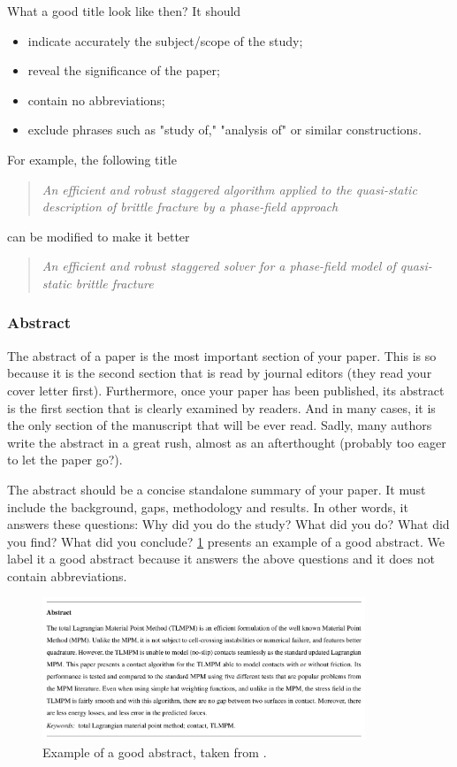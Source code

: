 \documentclass[authoryear,12pta4paper,fleqn]{article}
\numberwithin{equation}{section}
\theoremstyle{remark}
\begin{document}
What a good title look like then? It should

\begin{itemize}
\item indicate accurately the subject/scope of the study;
\item reveal the significance of the paper;
\item contain no abbreviations;
\item exclude phrases such as "study of," "analysis of" or similar constructions.
\end{itemize}

For example, the following title 
\begin{quote}
  \textit{An efficient and robust staggered algorithm applied to the quasi-static description 
  of brittle fracture by a phase-field approach}
 \end{quote}
can be modified to make it better
\begin{quote}
  \textit{An efficient and robust staggered solver for a phase-field model of  quasi-static 
  brittle fracture}
\end{quote}
\subsubsection{Abstract}\label{sec:abstract}

The abstract of a paper is the most important section of your paper. This is so because it is the second section that is read by journal editors (they read your cover letter first). Furthermore, once your paper has been published, its abstract is the first section that is clearly examined by readers. And in many cases, it is the only section of the manuscript that will be ever read. Sadly, many authors write the abstract in a great rush, almost as an afterthought (probably too eager to let the paper go?).

The abstract should be a concise standalone summary of your paper. It must include the background, gaps, methodology and results. In other words, it answers these questions: Why did you do the study? What did you do?  What did you find? What did you conclude? \cref{fig:abstract} presents an example of a good abstract. We label it a good abstract because it answers the above questions and it does not contain abbreviations.

\begin{figure}[h!]
\centering
\includegraphics[width=0.86\textwidth]{abstract}
\caption{Example of a good abstract, taken from \cite{Ambati:CMAME2016a}.}
\label{fig:abstract}
\end{figure}
\end{document}
